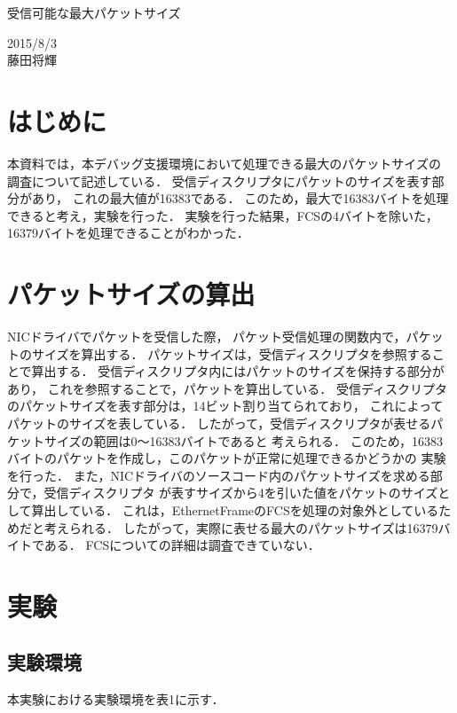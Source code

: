 \documentclass[12pt]{jsarticle}
\begin{document}

\begin{center}
    {\LARGE 受信可能な最大パケットサイズ}
\end{center}

\begin{flushright}
  2015/8/3\\
  藤田将輝
\end{flushright}
\section{はじめに}
本資料では，本デバッグ支援環境において処理できる最大のパケットサイズの
調査について記述している．
受信ディスクリプタにパケットのサイズを表す部分があり，
これの最大値が16383である．
このため，最大で16383バイトを処理できると考え，実験を行った．
実験を行った結果，FCSの4バイトを除いた，16379バイトを処理できることがわかった．
\section{パケットサイズの算出}
NICドライバでパケットを受信した際，
パケット受信処理の関数内で，パケットのサイズを算出する．
パケットサイズは，受信ディスクリプタを参照することで算出する．
受信ディスクリプタ内にはパケットのサイズを保持する部分があり，
これを参照することで，パケットを算出している．
受信ディスクリプタのパケットサイズを表す部分は，14ビット割り当てられており，
これによってパケットのサイズを表している．
したがって，受信ディスクリプタが表せるパケットサイズの範囲は0〜16383バイトであると
考えられる．
このため，16383バイトのパケットを作成し，このパケットが正常に処理できるかどうかの
実験を行った．
また，NICドライバのソースコード内のパケットサイズを求める部分で，受信ディスクリプタ
が表すサイズから4を引いた値をパケットのサイズとして算出している．
これは，EthernetFrameのFCSを処理の対象外としているためだと考えられる．
したがって，実際に表せる最大のパケットサイズは16379バイトである．
FCSについての詳細は調査できていない．
\section{実験}
\subsection{実験環境}
本実験における実験環境を表1に示す．
\end{document}
